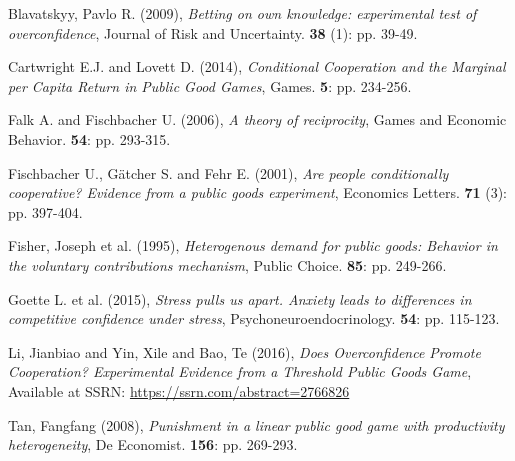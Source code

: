 \documentclass[11pt,twoside,a4paper,leqno]{article}
\begin{document}
\clearpage

\begin{thebibliography}{9}

  Blavatskyy, Pavlo R.
  (2009),
  \emph{Betting on own knowledge: experimental test of overconfidence},
  Journal of Risk and Uncertainty.
  \textbf{38} (1):
  pp. 39-49.

  Cartwright E.J. and Lovett D.
  (2014),
  \emph{Conditional Cooperation and the Marginal per Capita Return in
Public Good Games},
  Games.
  \textbf{5}:
  pp. 234-256.

  Falk A. and Fischbacher U.
  (2006),
  \emph{A theory of reciprocity},
  Games and Economic Behavior.
  \textbf{54}:
  pp. 293-315.

  Fischbacher U., Gätcher S. and Fehr E.
  (2001),
  \emph{Are people conditionally cooperative? Evidence from a public goods experiment},
  Economics Letters.
  \textbf{71} (3):
  pp. 397-404.
  
  Fisher, Joseph et al.
  (1995),
  \emph{Heterogenous demand for public goods: Behavior in the voluntary contributions mechanism},
  Public Choice.
  \textbf{85}:
  pp. 249-266.

  Goette L. et al.
  (2015),
  \emph{Stress pulls us apart. Anxiety leads to differences in competitive confidence under stress},
  Psychoneuroendocrinology.
  \textbf{54}:
  pp. 115-123.
  
  Li, Jianbiao and Yin, Xile and Bao, Te
  (2016),
  \emph{Does Overconfidence Promote Cooperation? Experimental Evidence from a Threshold Public Goods Game},
  Available at SSRN: \url{https://ssrn.com/abstract=2766826}
  
  Tan, Fangfang
  (2008),
  \emph{Punishment in a linear public good game with productivity heterogeneity},
  De Economist.
  \textbf{156}:
  pp. 269-293.


  
\end{thebibliography}
\end{document}
